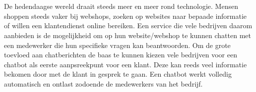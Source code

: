 
%
%

%



\chapter*{}

De hedendaagse wereld draait steeds meer en meer rond technologie. Mensen shoppen steeds vaker bij webshops, zoeken op websites naar bepaade informatie of willen een klantendienst online bereiken. Een service die vele bedrijven daarom aanbieden is de mogelijkheid om op hun website/webshop te kunnen chatten met een medewerker die hun specifieke vragen kan beantwoorden. Om de grote toevloed aan chatberichten de baas te kunnen kiezen vele bedrijven voor een chatbot als eerste aanpsreekpunt voor een klant. Deze kan reeds veel informatie bekomen door met de klant in gesprek te gaan. Een chatbot werkt volledig automatisch en ontlast zodoende de medewerkers van het bedrijf. 

